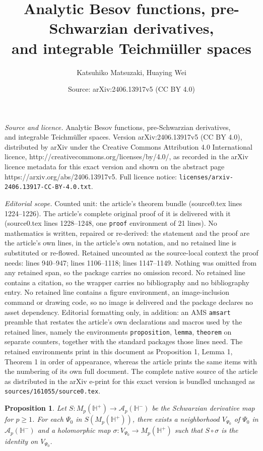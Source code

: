 \documentclass[10pt,a4paper]{amsart}
\title{Analytic Besov functions, pre-Schwarzian derivatives, \\and integrable Teich\-m\"ul\-ler spaces}
\author{Katsuhiko Matsuzaki, Huaying Wei}
\date{Source: arXiv:2406.13917v5 (CC BY 4.0)}
\newtheorem{proposition}{Proposition}
\begin{document}
\maketitle

\noindent\emph{Source and licence.} Analytic Besov functions, pre-Schwarzian derivatives, \\and integrable Teich\-m\"ul\-ler spaces. Version arXiv:2406.13917v5 (CC BY 4.0), distributed by arXiv under the Creative Commons Attribution 4.0 International licence, http://creativecommons.org/licenses/by/4.0/, as recorded in the arXiv licence metadata for this exact version and shown on the abstract page https://arxiv.org/abs/2406.13917v5. Full licence notice: \texttt{licenses/arxiv-2406.13917-CC-BY-4.0.txt}.\par\smallskip

\noindent\textit{Editorial scope.} Counted unit: the article's theorem bundle (source0.tex lines 1224--1226). The article's complete original proof of it is delivered with it (source0.tex lines 1228--1248, one \texttt{proof} environment of 21 lines). No mathematics is written, repaired or re-derived: the statement and the proof are the article's own lines, in the article's own notation, and no retained line is substituted or re-flowed.  Retained uncounted as the source-local context the proof needs: lines 940--947; lines 1106--1118; lines 1147--1149.  Nothing was omitted from any retained span, so the package carries no omission record.  No retained line contains a citation, so the wrapper carries no bibliography and no bibliography entry.  No retained line contains a figure environment, an image-inclusion command or drawing code, so no image is delivered and the package declares no asset dependency.  Editorial formatting only, in addition: an AMS \texttt{amsart} preamble that restates the article's own declarations and macros used by the retained lines, namely the environments \texttt{proposition}, \texttt{lemma}, \texttt{theorem} on separate counters, together with the standard packages those lines need.  The retained environments print in this document as Proposition 1, Lemma 1, Theorem 1 in order of appearance, whereas the article prints the same items with the numbering of its own full document.  The complete native source of the article as distributed in the arXiv e-print for this exact version is bundled unchanged as \texttt{sources/161055/source0.tex}.
\begin{proposition}\label{S-section}
Let $S:M_p(\mathbb H^+) \to {\mathcal A}_p(\mathbb H^-)$
be the Schwarzian derivative map for $p \geq 1$.
For each $\Psi_0$ in $S(M_p(\mathbb H^+))$, there exists a
neighborhood $V_{\Psi_0}$ of $\Psi_0$ in ${\mathcal A}_p(\mathbb H^-)$ 
and a holomorphic map $\sigma:V_{\Psi_0} \to M_p(\mathbb H^+)$ such that
$S \circ \sigma$ is the identity on $V_{\Psi_0}$.
\end{proposition}
\end{document}
